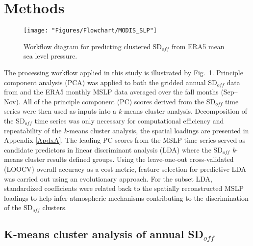 \documentclass{tATO2e}
\newcommand{\sdoff}{SD$_{off}$}
\begin{document}
\section{Methods}
\begin{figure}
\begin{center}
	\texttt{[image: "Figures/Flowchart/MODIS\_SLP"]}
	\caption{Workflow diagram for predicting clustered \sdoff{} from ERA5 mean sea level pressure.}
	\label{flow-chart}
\end{center}
\end{figure}

The processing workflow applied in this study is illustrated by Fig.~\ref{flow-chart}. Principle component analysis (PCA) was applied to both the gridded annual \sdoff{} data from \cite{Bevington2019} and the ERA5 monthly MSLP data averaged over the fall months (Sep--Nov). All of the principle component (PC) scores derived from the \sdoff{} time series were then used as inputs into a \textit{k}-means cluster analysis. Decomposition of the \sdoff{} time series was only necessary for computational efficiency and repeatability of the \textit{k}-means cluster analysis, the spatial loadings are presented in Appendix \ref{ApdxA}. The leading PC scores from the MSLP time series served as candidate predictors in linear discriminant analysis (LDA) where the \sdoff{} \textit{k}-means cluster results defined groups. Using the leave-one-out cross-validated (LOOCV) overall accuracy as a cost metric, feature selection for predictive LDA was carried out using an evolutionary approach. For the subset LDA, standardized coefficients were related back to the spatially reconstructed MSLP loadings to help infer atmospheric mechanisms contributing to the discrimination of the \sdoff{} clusters.   

\subsection{K-means cluster analysis of annual \sdoff{}}\label{kmeans}
\end{document}
